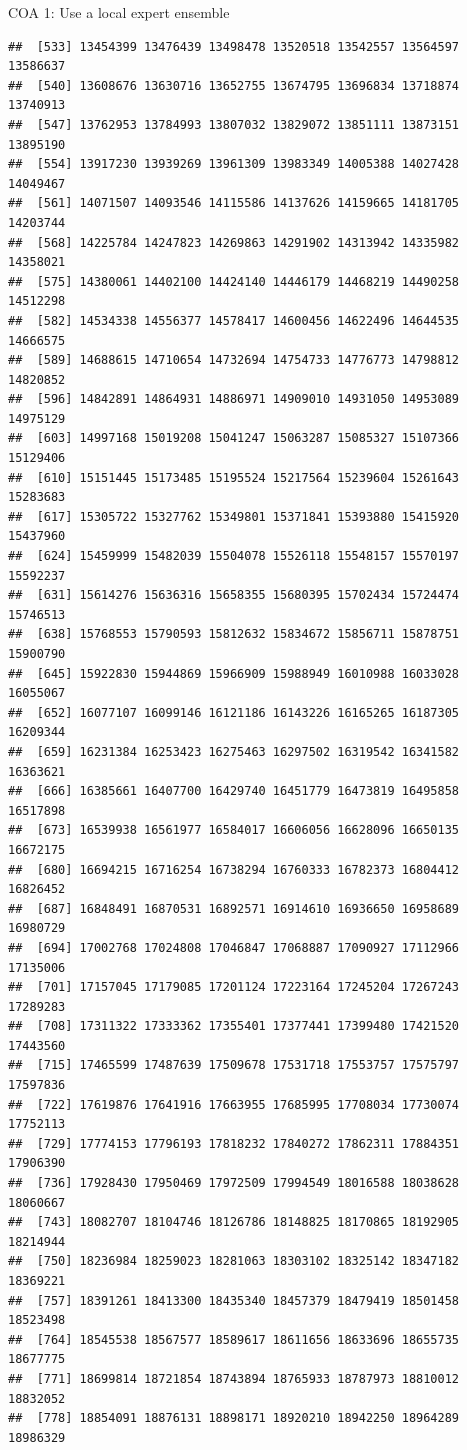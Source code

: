 \documentclass[ignorenonframetext,]{beamer}
\begin{document}
\begin{frame}[fragile]{COA 1: Use a local expert ensemble}
\begin{verbatim}
##  [533] 13454399 13476439 13498478 13520518 13542557 13564597 13586637
##  [540] 13608676 13630716 13652755 13674795 13696834 13718874 13740913
##  [547] 13762953 13784993 13807032 13829072 13851111 13873151 13895190
##  [554] 13917230 13939269 13961309 13983349 14005388 14027428 14049467
##  [561] 14071507 14093546 14115586 14137626 14159665 14181705 14203744
##  [568] 14225784 14247823 14269863 14291902 14313942 14335982 14358021
##  [575] 14380061 14402100 14424140 14446179 14468219 14490258 14512298
##  [582] 14534338 14556377 14578417 14600456 14622496 14644535 14666575
##  [589] 14688615 14710654 14732694 14754733 14776773 14798812 14820852
##  [596] 14842891 14864931 14886971 14909010 14931050 14953089 14975129
##  [603] 14997168 15019208 15041247 15063287 15085327 15107366 15129406
##  [610] 15151445 15173485 15195524 15217564 15239604 15261643 15283683
##  [617] 15305722 15327762 15349801 15371841 15393880 15415920 15437960
##  [624] 15459999 15482039 15504078 15526118 15548157 15570197 15592237
##  [631] 15614276 15636316 15658355 15680395 15702434 15724474 15746513
##  [638] 15768553 15790593 15812632 15834672 15856711 15878751 15900790
##  [645] 15922830 15944869 15966909 15988949 16010988 16033028 16055067
##  [652] 16077107 16099146 16121186 16143226 16165265 16187305 16209344
##  [659] 16231384 16253423 16275463 16297502 16319542 16341582 16363621
##  [666] 16385661 16407700 16429740 16451779 16473819 16495858 16517898
##  [673] 16539938 16561977 16584017 16606056 16628096 16650135 16672175
##  [680] 16694215 16716254 16738294 16760333 16782373 16804412 16826452
##  [687] 16848491 16870531 16892571 16914610 16936650 16958689 16980729
##  [694] 17002768 17024808 17046847 17068887 17090927 17112966 17135006
##  [701] 17157045 17179085 17201124 17223164 17245204 17267243 17289283
##  [708] 17311322 17333362 17355401 17377441 17399480 17421520 17443560
##  [715] 17465599 17487639 17509678 17531718 17553757 17575797 17597836
##  [722] 17619876 17641916 17663955 17685995 17708034 17730074 17752113
##  [729] 17774153 17796193 17818232 17840272 17862311 17884351 17906390
##  [736] 17928430 17950469 17972509 17994549 18016588 18038628 18060667
##  [743] 18082707 18104746 18126786 18148825 18170865 18192905 18214944
##  [750] 18236984 18259023 18281063 18303102 18325142 18347182 18369221
##  [757] 18391261 18413300 18435340 18457379 18479419 18501458 18523498
##  [764] 18545538 18567577 18589617 18611656 18633696 18655735 18677775
##  [771] 18699814 18721854 18743894 18765933 18787973 18810012 18832052
##  [778] 18854091 18876131 18898171 18920210 18942250 18964289 18986329

\end{verbatim}
\end{frame}
\end{document}
